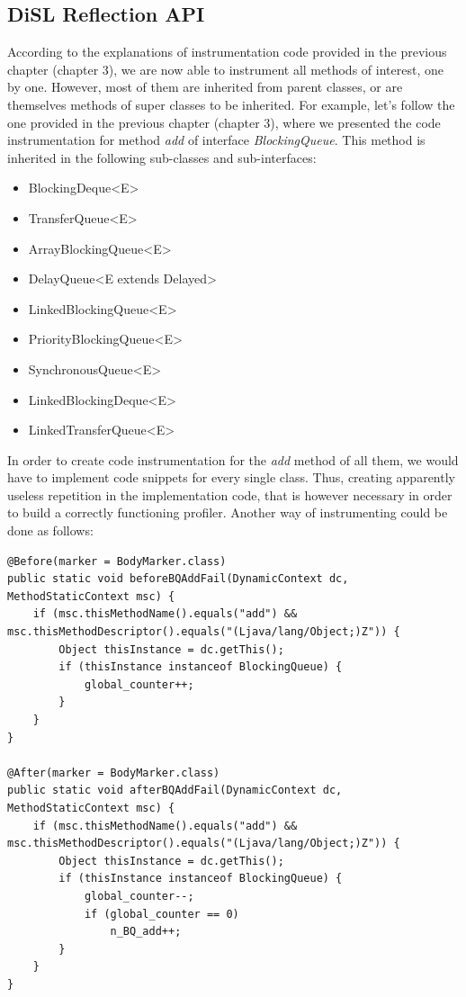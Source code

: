 \documentclass[]{usiinfthesis}
\begin{document}
\subsection{DiSL Reflection API}
According to the explanations of instrumentation code provided in the previous chapter (chapter 3), we are now able to instrument all methods of interest, one by one. However, most of them are inherited from parent classes, or are themselves methods of super classes to be inherited. For example, let's follow the one provided in the previous chapter (chapter 3), where we presented the code instrumentation for method \textit{add} of interface \textit{BlockingQueue}. This method is inherited in the following sub-classes and sub-interfaces: 
\begin{itemize}
    \item BlockingDeque<E>
    \item TransferQueue<E>
    \item ArrayBlockingQueue<E>
    \item DelayQueue<E extends Delayed>
    \item LinkedBlockingQueue<E>
    \item PriorityBlockingQueue<E>
    \item SynchronousQueue<E>
    \item LinkedBlockingDeque<E>
    \item LinkedTransferQueue<E>
\end{itemize}
In order to create code instrumentation for the \textit{add} method of all them, we would have to implement code snippets for every single class. Thus, creating apparently useless repetition in the implementation code, that is however necessary in order to build a correctly functioning profiler. Another way of instrumenting could be done as follows:

\vspace*{0.5cm}
\begin{verbatim}
@Before(marker = BodyMarker.class)
public static void beforeBQAddFail(DynamicContext dc, MethodStaticContext msc) {
    if (msc.thisMethodName().equals("add") && msc.thisMethodDescriptor().equals("(Ljava/lang/Object;)Z")) {
        Object thisInstance = dc.getThis();
        if (thisInstance instanceof BlockingQueue) {
            global_counter++;
        }
    }
}

@After(marker = BodyMarker.class)
public static void afterBQAddFail(DynamicContext dc, MethodStaticContext msc) {
    if (msc.thisMethodName().equals("add") && msc.thisMethodDescriptor().equals("(Ljava/lang/Object;)Z")) {
        Object thisInstance = dc.getThis();
        if (thisInstance instanceof BlockingQueue) {
            global_counter--;
            if (global_counter == 0)
                n_BQ_add++;
        }
    }
}
\end{verbatim}
\vspace*{0.5cm}
\end{document}

